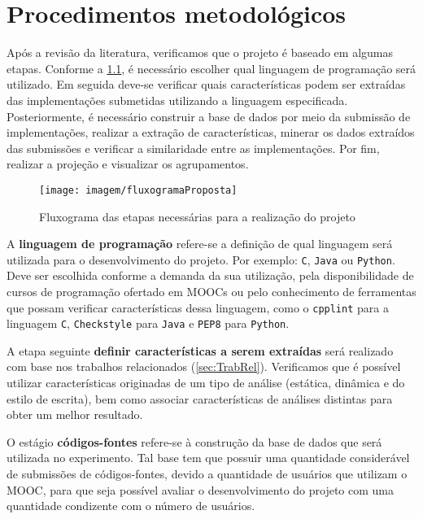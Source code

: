 \chapter{Procedimentos metodológicos}
\label{chap:Proposta}

Após a revisão da literatura, verificamos que o projeto é baseado em algumas etapas.
Conforme a \cref{fig:fluxogramaProposta}, é necessário escolher qual linguagem de programação
será utilizado. Em seguida deve-se verificar quais características podem ser extraídas
das implementações submetidas utilizando a linguagem especificada. Posteriormente, é
necessário construir a base de dados por meio da submissão de implementações, realizar
a extração de características, minerar os dados extraídos das submissões e verificar a
similaridade entre as implementações. Por fim, realizar a projeção e visualizar os
agrupamentos.

\begin{figure}[h]
	\centering
	\texttt{[image: imagem/fluxogramaProposta]}
	\caption{Fluxograma das etapas necessárias para a realização do projeto}
	\label{fig:fluxogramaProposta}
\end{figure}

A \textbf{linguagem de programação} refere-se a definição de qual linguagem será
utilizada para o desenvolvimento do projeto. Por exemplo: \texttt{C}, \texttt{Java}
ou \texttt{Python}. Deve ser escolhida conforme a demanda da sua utilização, pela
disponibilidade de cursos de programação ofertado em \acs{MOOC}s ou pelo conhecimento de
ferramentas que possam verificar características dessa linguagem, como o
\texttt{cpplint} para a linguagem \texttt{C}, \texttt{Checkstyle} para
\texttt{Java} e \texttt{PEP8} para \texttt{Python}.

A etapa seguinte \textbf{definir características a serem extraídas} será realizado
com base nos trabalhos relacionados (\cref{sec:TrabRel}). Verificamos que é
possível utilizar características originadas de um tipo de análise (estática,
dinâmica e do estilo de escrita), bem como associar características de análises
distintas para obter um melhor resultado.

O estágio \textbf{códigos-fontes} refere-se à construção da base de dados que será
utilizada no experimento. Tal base tem que possuir uma quantidade considerável de
submissões de códigos-fontes, devido a quantidade de usuários que utilizam o \acs{MOOC},
para que seja possível avaliar o desenvolvimento do projeto com uma quantidade
condizente com o número de usuários.

